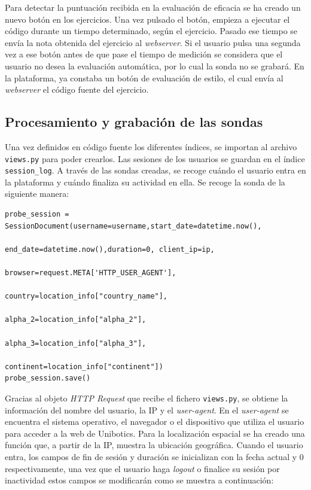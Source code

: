 Para detectar la puntuación recibida en la evaluación de eficacia se ha creado un nuevo botón en los ejercicios. Una vez pulsado el botón, empieza a ejecutar el código durante un tiempo determinado, según el ejercicio. Pasado ese tiempo se envía la nota obtenida del ejercicio al \textit{webserver}. Si el usuario pulsa una segunda vez a ese botón antes de que pase el tiempo de medición se considera que el usuario no desea la evaluación automática, por lo cual la sonda no se grabará. En la plataforma, ya constaba un botón de evaluación de estilo, el cual envía al \textit{webserver} el código fuente del ejercicio.

\subsection{Procesamiento y grabación de las sondas}
Una vez definidos en código fuente los diferentes índices, se importan al archivo \texttt{views.py} para poder crearlos. Las sesiones de los usuarios se guardan en el índice \texttt{session\_log}. A través de las sondas creadas, se recoge cuándo el usuario entra en la plataforma y cuándo finaliza su actividad en ella. Se recoge la sonda de la siguiente manera:
\\
\begin{lstlisting}
probe_session = SessionDocument(username=username,start_date=datetime.now(),
                                        end_date=datetime.now(),duration=0, client_ip=ip, 
                                        browser=request.META['HTTP_USER_AGENT'],
                                        country=location_info["country_name"],
                                        alpha_2=location_info["alpha_2"], 
                                        alpha_3=location_info["alpha_3"],
                                        continent=location_info["continent"])
probe_session.save()
\end{lstlisting}

Gracias al objeto \textit{HTTP Request} que recibe el fichero \texttt{views.py}, se obtiene la información del nombre del usuario, la IP y el \textit{user-agent}. En el \textit{user-agent} se encuentra el sistema operativo, el navegador o el dispositivo que utiliza el usuario para acceder a la web de Unibotics. Para la localización espacial se ha creado una función que, a partir de la IP, muestra la ubicación geográfica. Cuando el usuario entra, los campos de fin de sesión y duración se inicializan con la fecha actual y 0 respectivamente, una vez que el usuario haga \textit{logout} o finalice su sesión por inactividad estos campos se modificarán como se muestra a continuación:\\

